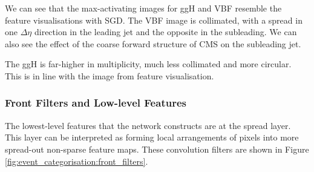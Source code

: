 We can see that the max-activating images for ggH and VBF resemble the feature visualisations with SGD. 
The VBF image is collimated, with a spread in one $\Delta\eta$ direction in the leading jet and the opposite in the subleading. We can also see the effect of the coarse forward structure of CMS on the subleading jet. 

The ggH is far-higher in multiplicity, much less collimated and more circular. This is in line with the image from feature visualisation. 


\subsubsection{Front Filters and Low-level Features}
The lowest-level features that the network constructs are at the spread layer. 
This layer can be interpreted as forming local arrangements of pixels into more spread-out non-sparse feature maps. 
These convolution filters are shown in Figure \ref{fig:event_categorisation:front_filters}.

